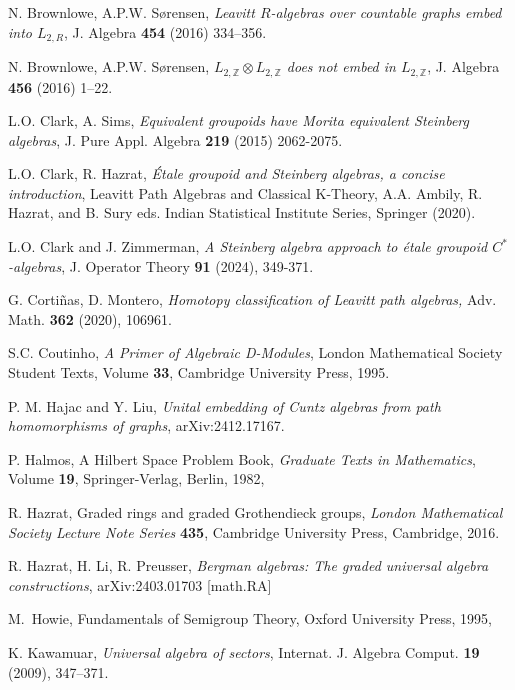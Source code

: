 \documentclass[a4paper, 11pt, reqno]{amsart}
\theoremstyle{definition}
\begin{document}
\begin{thebibliography}{}
 N. Brownlowe, A.P.W. S\o rensen, {\it Leavitt $R$-algebras over countable graphs embed
into $L_{2,R}$}, J. Algebra {\bf 454} (2016) 334--356.

  N. Brownlowe, A.P.W. S\o rensen, {\it $L_{2,\mathbb Z} \otimes L_{2,\mathbb Z}$  does not embed in $L_{2,\mathbb Z}$}, J. Algebra  {\bf 456} (2016) 1--22.  

 L.O. Clark, A. Sims, {\it Equivalent groupoids have Morita equivalent Steinberg algebras},  J. Pure Appl. Algebra {\bf 219} (2015) 2062-2075.

 L.O. Clark, R. Hazrat, {\it \'Etale groupoid and Steinberg algebras, a concise introduction}, Leavitt Path Algebras and Classical K-Theory,  A.A. Ambily, R. Hazrat, and B. Sury eds. Indian Statistical Institute Series, Springer (2020). 

 L.O. Clark and J. Zimmerman, {\it A Steinberg algebra approach to \'etale groupoid $C^*$-algebras},  J. Operator Theory {\bf 91} (2024),  349-371.

 G. Corti\~ nas, D. Montero, {\it Homotopy classification of Leavitt path algebras,} Adv. Math. {\bf 362} (2020), 106961. 

S.C. Coutinho, {\it A Primer of Algebraic D-Modules}, London Mathematical Society Student Texts, Volume {\bf 33}, Cambridge University Press, 1995.

 P. M. Hajac and Y. Liu, {\it Unital embedding of Cuntz algebras from path homomorphisms of graphs}, arXiv:2412.17167.

 P. Halmos,  A Hilbert Space Problem Book,  {\it Graduate Texts in Mathematics}, Volume {\bf 19},  Springer-Verlag, Berlin, 1982,

 R. Hazrat,  Graded rings and graded Grothendieck groups, \emph{London Mathematical Society Lecture
Note Series} {\bf 435}, Cambridge University Press, Cambridge, 2016.

 R. Hazrat, H. Li, R. Preusser, \emph{Bergman algebras: The graded universal algebra constructions}, 	arXiv:2403.01703 [math.RA]


 M.~Howie, Fundamentals of Semigroup Theory,
Oxford University Press, 1995, 


 K. Kawamuar, {\it Universal algebra of sectors},  Internat. J. Algebra Comput. \textbf{19} (2009), 347--371. 


\end{thebibliography}
\end{document}
